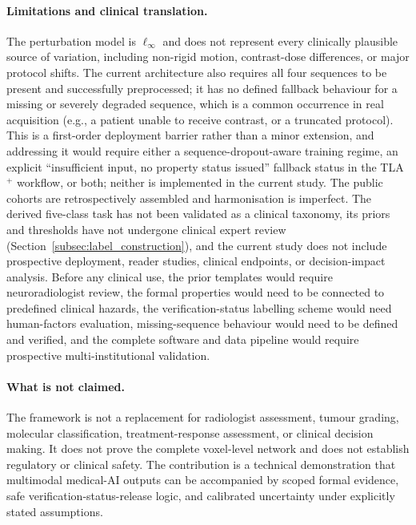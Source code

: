 \documentclass[preprint,11pt]{elsarticle}
\begin{document}
\paragraph{Limitations and clinical translation.}
The perturbation model is $\ell_\infty$ and does not represent every clinically plausible source of variation, including non-rigid motion, contrast-dose differences, or major protocol shifts. The current architecture also requires all four sequences to be present and successfully preprocessed; it has no defined fallback behaviour for a missing or severely degraded sequence, which is a common occurrence in real acquisition (e.g., a patient unable to receive contrast, or a truncated protocol). This is a first-order deployment barrier rather than a minor extension, and addressing it would require either a sequence-dropout-aware training regime, an explicit ``insufficient input, no property status issued'' fallback status in the TLA$^{+}$ workflow, or both; neither is implemented in the current study. The public cohorts are retrospectively assembled and harmonisation is imperfect. The derived five-class task has not been validated as a clinical taxonomy, its priors and thresholds have not undergone clinical expert review (Section~\ref{subsec:label_construction}), and the current study does not include prospective deployment, reader studies, clinical endpoints, or decision-impact analysis. Before any clinical use, the prior templates would require neuroradiologist review, the formal properties would need to be connected to predefined clinical hazards, the verification-status labelling scheme would need human-factors evaluation, missing-sequence behaviour would need to be defined and verified, and the complete software and data pipeline would require prospective multi-institutional validation.

\paragraph{What is not claimed.}
The framework is not a replacement for radiologist assessment, tumour grading, molecular classification, treatment-response assessment, or clinical decision making. It does not prove the complete voxel-level network and does not establish regulatory or clinical safety. The contribution is a technical demonstration that multimodal medical-AI outputs can be accompanied by scoped formal evidence, safe verification-status-release logic, and calibrated uncertainty under explicitly stated assumptions.
\end{document}
